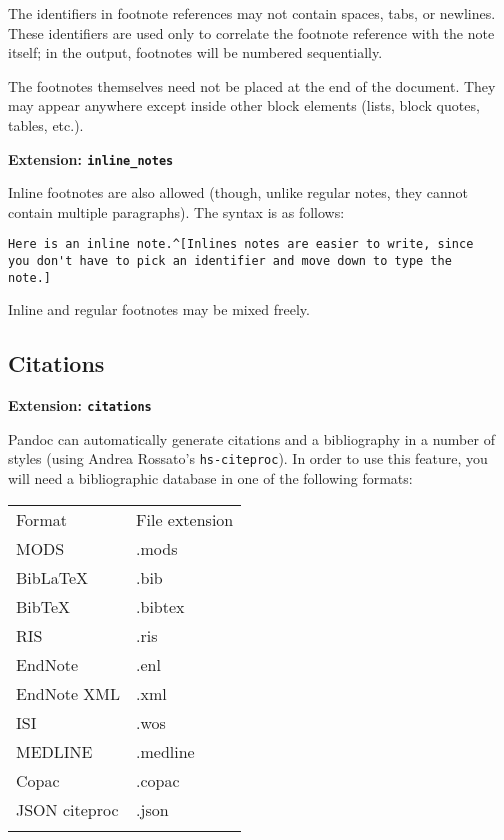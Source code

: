 \documentclass[]{article}
\begin{document}
The identifiers in footnote references may not contain spaces, tabs, or
newlines. These identifiers are used only to correlate the footnote
reference with the note itself; in the output, footnotes will be
numbered sequentially.

The footnotes themselves need not be placed at the end of the document.
They may appear anywhere except inside other block elements (lists,
block quotes, tables, etc.).

\textbf{Extension: \texttt{inline\_notes}}

Inline footnotes are also allowed (though, unlike regular notes, they
cannot contain multiple paragraphs). The syntax is as follows:

\begin{verbatim}
Here is an inline note.^[Inlines notes are easier to write, since
you don't have to pick an identifier and move down to type the
note.]
\end{verbatim}

Inline and regular footnotes may be mixed freely.

\subsection{Citations}

\textbf{Extension: \texttt{citations}}

Pandoc can automatically generate citations and a bibliography in a
number of styles (using Andrea Rossato's \texttt{hs-citeproc}). In order
to use this feature, you will need a bibliographic database in one of
the following formats:

\begin{longtable}[c]{@{}ll@{}}
\hline\noalign{\medskip}
Format & File extension
\\\noalign{\medskip}
\hline\noalign{\medskip}
MODS & .mods
\\\noalign{\medskip}
BibLaTeX & .bib
\\\noalign{\medskip}
BibTeX & .bibtex
\\\noalign{\medskip}
RIS & .ris
\\\noalign{\medskip}
EndNote & .enl
\\\noalign{\medskip}
EndNote XML & .xml
\\\noalign{\medskip}
ISI & .wos
\\\noalign{\medskip}
MEDLINE & .medline
\\\noalign{\medskip}
Copac & .copac
\\\noalign{\medskip}
JSON citeproc & .json
\\\noalign{\medskip}
\hline
\end{longtable}
\end{document}
